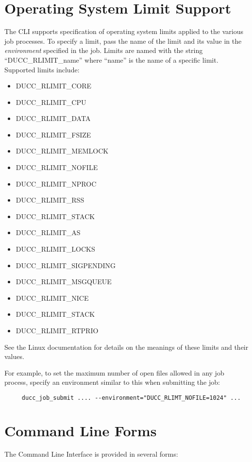     \section{Operating System Limit Support}
    The CLI supports specification of operating system limits applied to the various job processes.
    To specify a limit, pass the name of the limit and its value in the {\em environment} specified
    in the job.  Limits are named with the string ``DUCC\_RLIMIT\_name'' where ``name'' is the name of
    a specific limit.  Supported limits include:
    \begin{itemize}
       \item DUCC\_RLIMIT\_CORE    
       \item DUCC\_RLIMIT\_CPU    
       \item DUCC\_RLIMIT\_DATA   
       \item DUCC\_RLIMIT\_FSIZE  
       \item DUCC\_RLIMIT\_MEMLOCK
       \item DUCC\_RLIMIT\_NOFILE 
       \item DUCC\_RLIMIT\_NPROC  
       \item DUCC\_RLIMIT\_RSS    
       \item DUCC\_RLIMIT\_STACK  
       \item DUCC\_RLIMIT\_AS        
       \item DUCC\_RLIMIT\_LOCKS     
       \item DUCC\_RLIMIT\_SIGPENDING
       \item DUCC\_RLIMIT\_MSGQUEUE  
       \item DUCC\_RLIMIT\_NICE      
       \item DUCC\_RLIMIT\_STACK     
       \item DUCC\_RLIMIT\_RTPRIO   
    \end{itemize}
    See the Linux documentation for details on the meanings of these limits and their values.

    For example, to set the maximum number of open files allowed in any job process, specify 
    an environment similar to this when submitting the job:
\begin{verbatim}
     ducc_job_submit .... --environment="DUCC_RLIMT_NOFILE=1024" ...
\end{verbatim}
    
    \section{Command  Line Forms}
    The Command Line Interface is provided in several forms:

